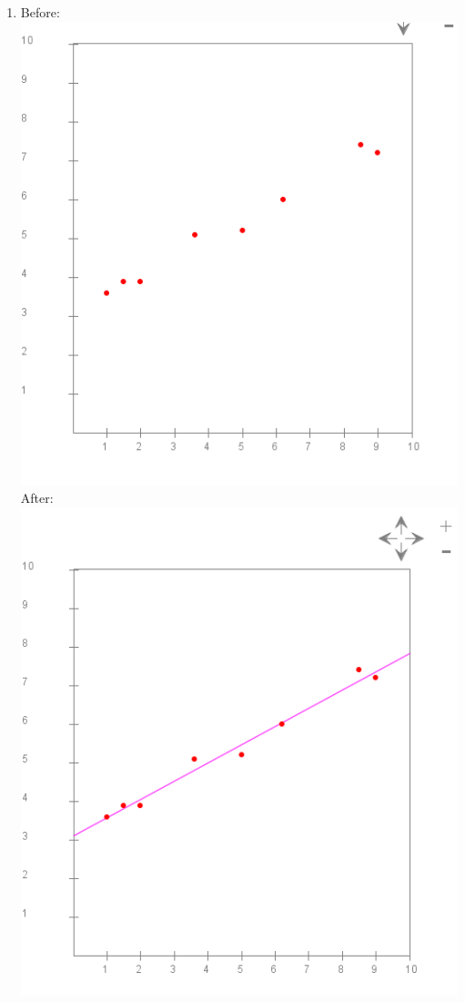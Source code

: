 \documentclass{article}
\begin{document}
\begin{enumerate}
\item Before:\\
\includegraphics[scale=0.4]{module7_exercise15_a}\\
After:\\
\includegraphics[scale=0.4]{module7_exercise15_b}


\end{enumerate}
\end{document}
